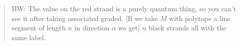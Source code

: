 \documentclass[11pt]{article}
\begin{document}
\begin{quotation}
    BW: The value on the red strand is a purely quantum thing, so you can't see it after taking associated graded. 
% 
    [If we take $M$ with polytope a line segment of length $n$ in direction $\alpha$ we get] $n$ black strands all with the same label.
\end{quotation}
% 
% 

%


%
%
\end{document}
